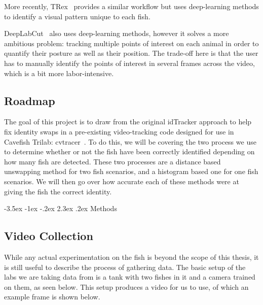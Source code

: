 \documentclass{article}
\makeatletter
\renewcommand\section{\clearpage\newpage\@startsection {section}{1}{\z@}%
	{-3.5ex \@plus -1ex \@minus -.2ex}%
	{2.3ex \@plus.2ex}%
	{\normalfont\Large\bfseries}}
\makeatother
\begin{document}
More recently, TRex~\cite{walter_trex_2021} provides a similar workflow but uses deep-learning methods to identify a visual pattern unique to each fish.

DeepLabCut~\cite{mathis_deeplabcut_2018} also uses deep-learning methods, however it solves a more ambitious problem: tracking multiple points of interest on each animal in order to quantify their posture as well as their position. The trade-off here is that the user has to manually identify the points of interest in several frames across the video, which is a bit more labor-intensive.

\subsection{Roadmap}

The goal of this project is to draw from the original idTracker approach to help fix identity swaps in a pre-existing video-tracking code designed for use in Cavefish Trilab: cvtracer~\cite{patch_kinematic_2020, patch_patchmemorycvtracer_2020}. To do this, we will be covering the two process we use to determine whether or not the fish have been correctly identified depending on how many fish are detected. These two processes are a distance based unswapping method for two fish scenarios, and a histogram based one for one fish scenarios. We will then go over how accurate each of these methods were at giving the fish the correct identity.

\section{Methods}

\subsection{Video Collection}
While any actual experimentation on the fish is beyond the scope of this thesis, it is still useful to describe the process of gathering data. The basic setup of the labs we are taking data from is a tank with two fishes in it and a camera trained on them, as seen below. 
This setup produces a video for us to use, of which an example frame is shown below.
\end{document}
